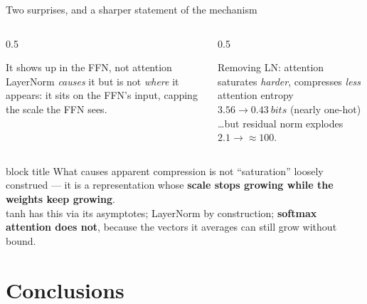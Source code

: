 \documentclass[aspectratio=169,11pt]{beamer}
\begin{document}
\begin{frame}{Two surprises, and a sharper statement of the mechanism}
\begin{columns}[T]
\begin{column}{0.5\textwidth}
\begin{alertblock}{It shows up in the FFN, not attention}
LayerNorm \emph{causes} it but is not \emph{where} it appears: it sits on the FFN's
input, capping the scale the FFN sees.
\end{alertblock}
\end{column}
\begin{column}{0.5\textwidth}
\begin{alertblock}{Removing LN: attention saturates \emph{harder}, compresses \emph{less}}
attention entropy $3.56 \to \SI{0.43}{bits}$ (nearly one-hot)\\
\ldots but residual norm explodes $2.1 \to \approx 100$.
\end{alertblock}
\end{column}
\end{columns}
\bigskip
\begin{beamercolorbox}[sep=6pt,center,rounded=true]{block title}
What causes apparent compression is not ``saturation'' loosely construed --- it is a
representation whose \textbf{scale stops growing while the weights keep growing}.\\[3pt]
\small tanh has this via its asymptotes; LayerNorm by construction; \textbf{softmax attention does not},
because the vectors it averages can still grow without bound.
\end{beamercolorbox}
\end{frame}

\section{Conclusions}
\end{document}
